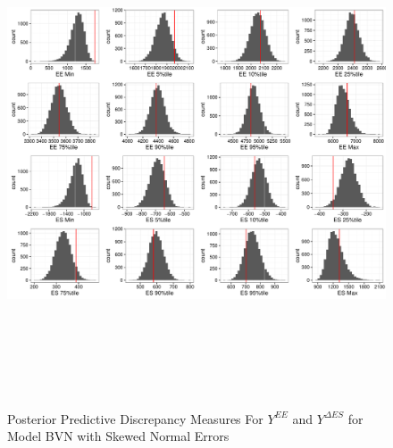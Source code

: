 \documentclass[11pt]{article}\usepackage[]{graphicx}\usepackage[]{color}
\begin{document}
  \begin{figure}
  \centering
  \includegraphics[width=17cm,height=15cm]{manual_figure/wpydiagbvns.pdf}
  \caption{Posterior Predictive Discrepancy Measures For $Y^{EE}$ and $Y^{\Delta ES}$ for Model BVN with Skewed Normal Errors}
  \label{wpydiagbvns}
  \end{figure}
  
\end{document}

